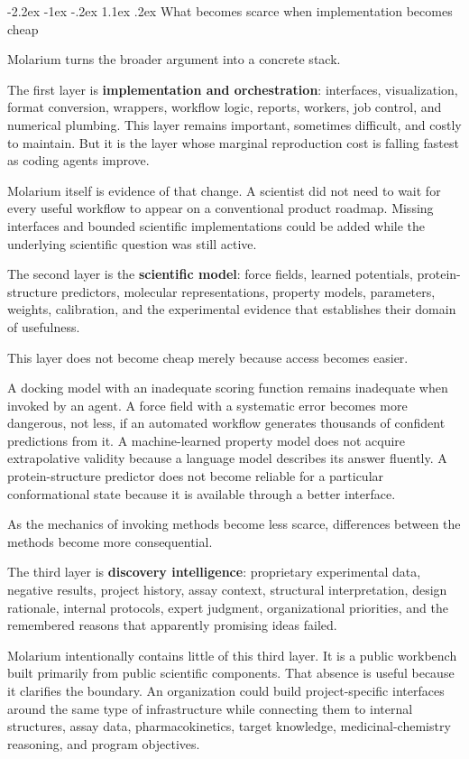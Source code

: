 \documentclass[11pt]{article}
\makeatletter
\renewcommand\section{\@startsection{section}{1}{\z@}%
  {-2.2ex \@plus -1ex \@minus -.2ex}%
  {1.1ex \@plus .2ex}%
  {\normalfont\Large\bfseries\color{molblue}}}
\makeatother
\begin{document}
\section{What becomes scarce when implementation becomes cheap}

Molarium turns the broader argument into a concrete stack.

The first layer is \textbf{implementation and orchestration}: interfaces, visualization, format conversion, wrappers, workflow logic, reports, workers, job control, and numerical plumbing. This layer remains important, sometimes difficult, and costly to maintain. But it is the layer whose marginal reproduction cost is falling fastest as coding agents improve.

Molarium itself is evidence of that change. A scientist did not need to wait for every useful workflow to appear on a conventional product roadmap. Missing interfaces and bounded scientific implementations could be added while the underlying scientific question was still active.

The second layer is the \textbf{scientific model}: force fields, learned potentials, protein-structure predictors, molecular representations, property models, parameters, weights, calibration, and the experimental evidence that establishes their domain of usefulness.

This layer does not become cheap merely because access becomes easier.

A docking model with an inadequate scoring function remains inadequate when invoked by an agent. A force field with a systematic error becomes more dangerous, not less, if an automated workflow generates thousands of confident predictions from it. A machine-learned property model does not acquire extrapolative validity because a language model describes its answer fluently. A protein-structure predictor does not become reliable for a particular conformational state because it is available through a better interface.

As the mechanics of invoking methods become less scarce, differences between the methods become more consequential.

The third layer is \textbf{discovery intelligence}: proprietary experimental data, negative results, project history, assay context, structural interpretation, design rationale, internal protocols, expert judgment, organizational priorities, and the remembered reasons that apparently promising ideas failed.

Molarium intentionally contains little of this third layer. It is a public workbench built primarily from public scientific components. That absence is useful because it clarifies the boundary. An organization could build project-specific interfaces around the same type of infrastructure while connecting them to internal structures, assay data, pharmacokinetics, target knowledge, medicinal-chemistry reasoning, and program objectives.
\end{document}

